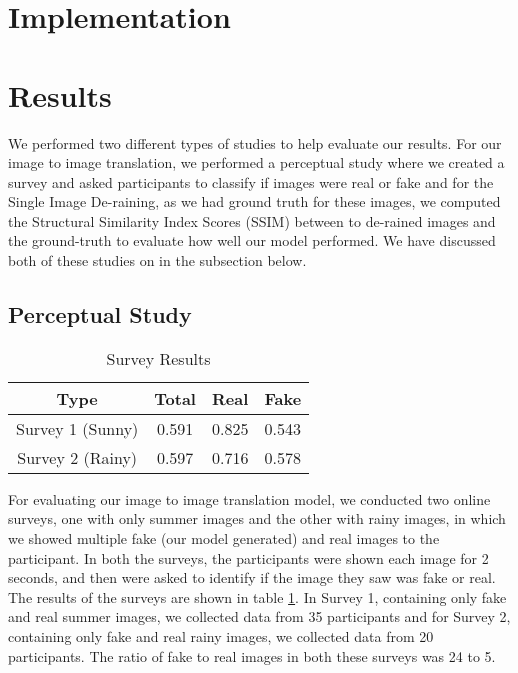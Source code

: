 \documentclass{article}
\begin{document}
\section{Implementation}

\section{Results}

We performed two different types of studies to help evaluate our results. For our image to image translation, we performed a perceptual study where we created a survey and asked participants to classify if images were real or fake and for the Single Image De-raining, as we had ground truth for these images, we computed the Structural Similarity Index Scores (SSIM) between to de-rained images and the ground-truth to evaluate how well our model performed. We have discussed both of these studies on in the subsection below.

\subsection{Perceptual Study}

\begin{table} [h!]
\centering
\begin{tabular}{ | c | c | c | c |}
\hline
 Type & Total & Real & Fake \\ 
\hline
 Survey 1 (Sunny) &  0.591 & 0.825 & 0.543 \\  
 Survey 2 (Rainy) & 0.597 & 0.716 & 0.578 \\
 \hline
\end{tabular}
\caption{Survey Results}
\label{table:1}
\end{table}

For evaluating our image to image translation model, we conducted two online surveys, one with only summer images and the other with rainy images, in which we showed multiple fake (our model generated) and real images to the participant. In both the surveys, the participants were shown each image for 2 seconds, and then were asked to identify if the image they saw was fake or real. The results of the surveys are shown in table \ref{table:1}. In Survey 1, containing only fake and real summer images, we collected data from 35 participants and for Survey 2, containing only fake and real rainy images, we collected data from 20 participants. The ratio of fake to real images in both these surveys was 24 to 5. 
\end{document}

